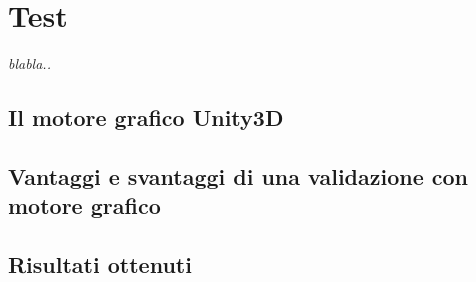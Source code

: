\chapter{Test}
\label{chap:test}

\begin{minipage}{12cm}\textit{blabla..}
\end{minipage}

\vspace*{1cm}

\section{Il motore grafico Unity3D}
\label{sec:unity}


\section{Vantaggi e svantaggi di una validazione con motore grafico}
\label{sec:valid}

\section{Risultati ottenuti}
\label{sec:perf}


